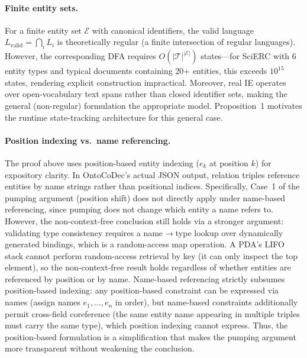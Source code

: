 \paragraph{Finite entity sets.}
For a finite entity set $\mathcal{E}$ with canonical identifiers, the valid language $L_{\text{valid}} = \bigcap_i L_i$ is theoretically regular (a finite intersection of regular languages).
However, the corresponding DFA requires $O(|\mathcal{T}|^{|\mathcal{E}|})$ states---for SciERC with 6 entity types and typical documents containing 20+ entities, this exceeds $10^{15}$ states, rendering explicit construction impractical.
Moreover, real IE operates over open-vocabulary text spans rather than closed identifier sets, making the general (non-regular) formulation the appropriate model.
Proposition~1 motivates the runtime state-tracking architecture for this general case.

\paragraph{Position indexing vs.\ name referencing.}
The proof above uses position-based entity indexing ($e_k$ at position $k$) for expository clarity.
In OntoCoDec's actual JSON output, relation triples reference entities by name strings rather than positional indices.
Specifically, Case~1 of the pumping argument (position shift) does not directly apply under name-based referencing, since pumping does not change which entity a name refers to. However, the non-context-free conclusion still holds via a stronger argument:
validating type consistency requires a name$\to$type lookup over dynamically generated bindings, which is a random-access map operation.
A PDA's LIFO stack cannot perform random-access retrieval by key (it can only inspect the top element), so the non-context-free result holds regardless of whether entities are referenced by position or by name.
Name-based referencing strictly subsumes position-based indexing: any position-based constraint can be expressed via names (assign names $e_1, \ldots, e_n$ in order), but name-based constraints additionally permit cross-field coreference (the same entity name appearing in multiple triples must carry the same type), which position indexing cannot express.
Thus, the position-based formulation is a simplification that makes the pumping argument more transparent without weakening the conclusion.
